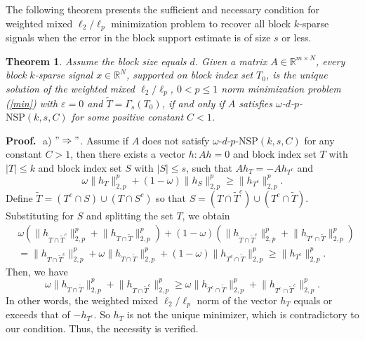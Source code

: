 \documentclass[11pt]{article}
\newtheorem{theorem}{Theorem}
\begin{document}
The following theorem presents the sufficient and necessary condition for weighted mixed $\ell_2/\ell_p$ minimization problem to recover all block $k$-sparse signals when the error in the block support estimate is of size $s$ or less.


\begin{theorem}
Assume the block size equals $d$. Given a matrix $A\in\mathbb{R}^{m\times N}$, every block $k$-sparse signal $x\in\mathbb{R}^N$, supported on block index set $T_0$, is the unique solution of the weighted mixed $\ell_2/\ell_p$, $0<p\leq 1$ norm minimization problem (\ref{min}) with $\varepsilon=0$ and $\tilde{T}=\Gamma_s(T_0)$, if and only if $A$ satisfies $\omega$-$d$-$p$-$\mathrm{NSP}(k,s,C)$ for some positive constant $C<1$. 
\end{theorem}


\noindent
{\bf Proof.} \,\,a) $"\Rightarrow"$. Assume if $A$ does not satisfy $\omega$-$d$-$p$-$\mathrm{NSP}(k,s,C)$ for any constant $C>1$, then there exists a vector $h: Ah=0$ and block index set $T$ with $|T|\leq k$ and block index set $S$ with $|S|\leq s$, such that $Ah_T=-Ah_{T^c}$ and $$
\omega\lVert h_T\rVert_{2,p}^p+(1-\omega)\lVert h_S\rVert_{2,p}^p\geq \lVert h_{T^c}\rVert_{2,p}^p.
$$
Define $\tilde{T}=(T^c\cap S)\cup(T\cap S^c)$ so that $S=(T\cap\tilde{T}^c)\cup(T^c\cap\tilde{T})$. Substituting for $S$ and splitting the set $T$, we obtain \begin{align*}
&\omega\left(\lVert h_{T\cap \tilde{T}^c}\rVert_{2,p}^p+\lVert h_{T\cap\tilde{T}}\rVert_{2,p}^p\right)+(1-\omega)\left(\lVert h_{T\cap \tilde{T}^c}\rVert_{2,p}^p+\lVert h_{T^c\cap\tilde{T}}\rVert_{2,p}^p\right)\\
&=\lVert h_{T\cap \tilde{T}^c}\rVert_{2,p}^p+\omega\lVert h_{T\cap \tilde{T}}\rVert_{2,p}^p+(1-\omega)\lVert h_{T^c\cap \tilde{T}}\rVert_{2,p}^p\geq
\lVert h_{T^c}\rVert_{2,p}^p.
\end{align*}
Then, we have $$
\omega\lVert h_{T\cap \tilde{T}}\rVert_{2,p}^p+\lVert h_{T\cap \tilde{T}^c}\rVert_{2,p}^p\geq \omega\lVert h_{T^c\cap \tilde{T}}\rVert_{2,p}^p+\lVert h_{T^c\cap \tilde{T}^c}\rVert_{2,p}^p.
$$
In other words, the weighted mixed $\ell_2/\ell_p$ norm of the vector $h_T$ equals or exceeds that of $-h_{T^c}$. So $h_T$ is not the unique minimizer, which is contradictory to our condition. Thus, the necessity is verified. \\
\end{document}

